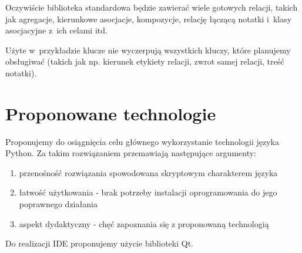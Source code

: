 \documentclass[a4paper,11pt,title]{report}
\begin{document}
Oczywiście biblioteka standardowa będzie zawierać wiele gotowych relacji, takich jak agregacje,
kierunkowe asocjacje, kompozycje, relację łączącą notatki i~klasy asocjacyjne z~ich celami itd.

Użyte w~przykładzie klucze nie wyczerpują wszystkich kluczy, które planujemy obsługiwać (takich jak
np. kierunek etykiety relacji, zwrot samej relacji, treść notatki).


\section{Proponowane technologie}
Proponujemy do osiągnięcia celu głównego wykorzystanie technologii języka Python. Za takim
rozwiązaniem przemawiają następujące argumenty:
\begin{enumerate}
  \item{przenośność rozwiązania spowodowana skryptowym charakterem języka}
  \item{łatwość użytkowania - brak potrzeby instalacji oprogramowania do jego poprawnego działania}
  \item{aspekt dydaktyczny - chęć zapoznania się z proponowaną technologią}
\end{enumerate}
Do realizacji IDE proponujemy użycie biblioteki Qt.
\end{document}
